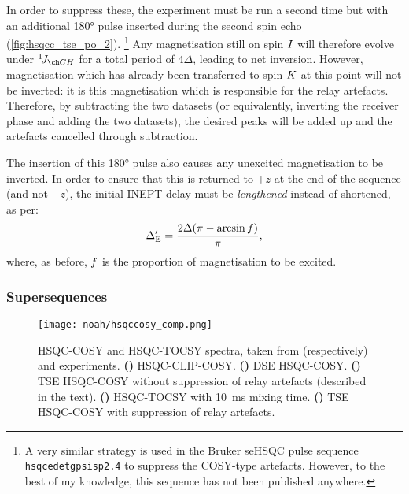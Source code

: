 In order to suppress these, the experiment must be run a second time but with an additional \ang{180} \carbon{} pulse inserted during the second spin echo (\cref{fig:hsqcc_tse_po_2}).%
\footnote{A very similar strategy is used in the Bruker seHSQC pulse sequence \texttt{hsqcedetgpsisp2.4} to suppress the COSY-type artefacts. However, to the best of my knowledge, this sequence has not been published anywhere.}
Any magnetisation still on spin $I\/$ will therefore evolve under $\oneJ{CH}$ for a total period of $4\Delta$, leading to net inversion.
However, magnetisation which has already been transferred to spin $K\/$ at this point will not be inverted: it is this magnetisation which is responsible for the relay artefacts.
Therefore, by subtracting the two datasets (or equivalently, inverting the receiver phase and adding the two datasets), the desired peaks will be added up and the artefacts cancelled through subtraction.

The insertion of this \ang{180} pulse also causes any unexcited  magnetisation to be inverted.
In order to ensure that this is returned to $+z$ at the end of the sequence (and not $-z$), the initial INEPT delay must be \textit{lengthened} instead of shortened, as per:
\begin{equation}
    \label{eq:delta_e_prime}
    \Delta_{\text{E}}' = \frac{2\Delta (\pi - \arcsin f)}{\pi},
\end{equation}
where, as before, $f\/$ is the proportion of magnetisation to be excited.


\subsubsection{Supersequences}

\begin{figure}[!htp]
    \centering
    \texttt{[image: noah/hsqccosy\_comp.png]}%
    {\label{fig:hsqccosy_comp_clip}}%
    {\label{fig:hsqccosy_comp_dse}}%
    {\label{fig:hsqccosy_comp_tse_norps}}%
    {\label{fig:hsqccosy_comp_tocsy}}%
    {\label{fig:hsqccosy_comp_tse}}%
    \caption[Comparison of spectra acquired with different HSQC-COSY modules]{
        HSQC-COSY and HSQC-TOCSY spectra, taken from (respectively)  and  experiments.
        \textbf{()} HSQC-CLIP-COSY.
        \textbf{()} DSE HSQC-COSY.
        \textbf{()} TSE HSQC-COSY without suppression of relay artefacts (described in the text).
        \textbf{()} HSQC-TOCSY with \qty{10}{\ms} mixing time.
        \textbf{()} TSE HSQC-COSY with suppression of relay artefacts.
    }
    \label{fig:hsqccosy_comp}
\end{figure}

